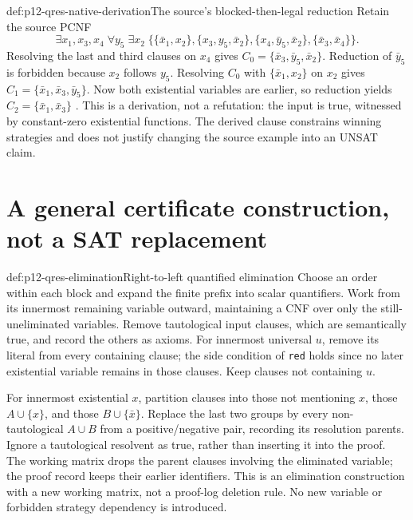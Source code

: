 \begin{hbexample}{def:p12-qres-native-derivation}{The source's blocked-then-legal reduction}
Retain the source PCNF
\[
 \exists x_1,x_3,x_4\;\forall y_5\;\exists x_2\;
 \{\{\bar x_1,x_2\},\{x_3,y_5,\bar x_2\},
   \{x_4,\bar y_5,\bar x_2\},\{\bar x_3,\bar x_4\}\}.
\]
Resolving the last and third clauses on \(x_4\) gives
\(C_0=\{\bar x_3,\bar y_5,\bar x_2\}\).  Reduction of \(\bar y_5\)
is forbidden because \(x_2\) follows \(y_5\).  Resolving \(C_0\) with
\(\{\bar x_1,x_2\}\) on \(x_2\) gives
\(C_1=\{\bar x_1,\bar x_3,\bar y_5\}\).  Now both existential variables
are earlier, so reduction yields \(C_2=\{\bar x_1,\bar x_3\}\)
\cite[Example~2.3.1]{BeyersdorffEtAl2021QBFJulyAuthor}.
This is a derivation, not a refutation: the input is true, witnessed by
constant-zero existential functions.  The derived clause constrains winning
strategies and does not justify changing the source example into an UNSAT
claim.
\end{hbexample}

\section{A general certificate construction, not a SAT replacement}

\begin{hbmethod}{def:p12-qres-elimination}{Right-to-left quantified elimination}
Choose an order within each block and expand the finite prefix into scalar
quantifiers.  Work from its innermost remaining variable outward, maintaining
a CNF over only the still-uneliminated variables.  Remove tautological input
clauses, which are semantically true, and record the others as axioms.
For innermost universal \(u\), remove its literal from every containing
clause; the side condition of \texttt{red} holds since no later existential
variable remains in those clauses.  Keep clauses not containing \(u\).

For innermost existential \(x\), partition clauses into those not mentioning
\(x\), those \(A\cup\{x\}\), and those \(B\cup\{\bar x\}\).
Replace the last two groups by every non-tautological \(A\cup B\) from
a positive/negative pair, recording its resolution parents.  Ignore a
tautological resolvent as true, rather than inserting it into the proof.
The working matrix drops the parent clauses involving the eliminated variable;
the proof record keeps their earlier identifiers.  This is an elimination
construction with a new working matrix, not a proof-log deletion rule.
No new variable or forbidden strategy dependency is introduced.
\end{hbmethod}

